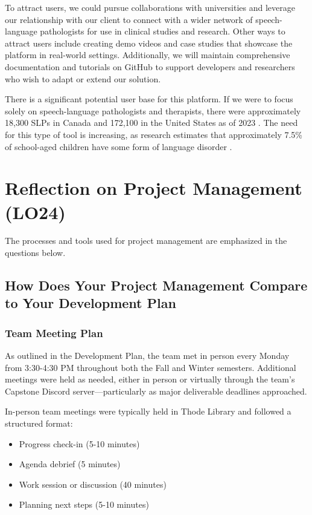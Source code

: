 \documentclass{article}
\begin{document}
To attract users, we could pursue collaborations with universities and leverage our relationship with our client to connect with a wider network 
of speech-language pathologists for use in clinical studies and research. Other ways to attract users include creating demo videos and case studies that showcase 
the platform in real-world settings. Additionally, we will maintain comprehensive documentation and tutorials on GitHub to support developers 
and researchers who wish to adapt or extend our solution.

There is a significant potential user base for this platform. If we were to focus solely on speech-language pathologists and therapists, 
there were approximately 18,300 SLPs in Canada \cite{canadaslp} and 172,100 in the United States as of 2023 \cite{usslp}. The need for this type 
of tool is increasing, as research estimates that approximately 7.5\% of school-aged children have some form of language disorder \cite{childstats}. 

\section{Reflection on Project Management (LO24)}

\hspace{2em} The processes and tools used for project management are emphasized in the questions below.

\subsection{How Does Your Project Management Compare to Your Development Plan}

\subsubsection{Team Meeting Plan}

\hspace{2em}As outlined in the Development Plan, the team met in person every Monday from 3:30-4:30 PM throughout both the Fall and Winter semesters. Additional meetings were held as needed, either in person or virtually through the team's Capstone Discord server—particularly as major deliverable deadlines approached.

In-person team meetings were typically held in Thode Library and followed a structured format:
\begin{itemize}
    \item Progress check-in (5-10 minutes)
    \item Agenda debrief (5 minutes)
    \item Work session or discussion (40 minutes)
    \item Planning next steps (5-10 minutes)
\end{itemize}
\end{document}
